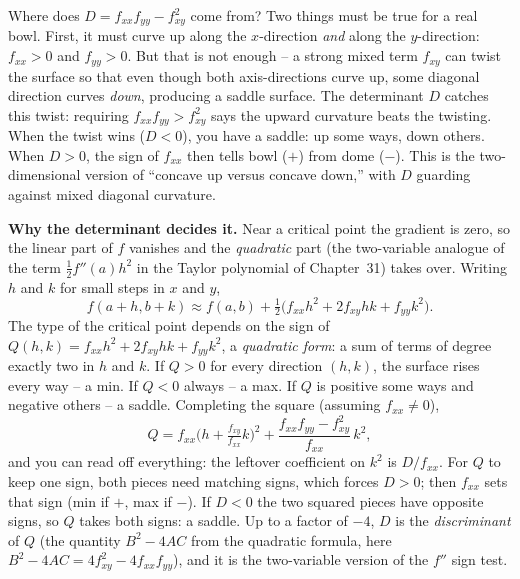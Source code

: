 \begin{intuitionbox}
Where does $D = f_{xx}f_{yy}-f_{xy}^2$ come from? Two things must be
true for a real bowl. First, it must curve up along the $x$-direction
\emph{and} along the $y$-direction: $f_{xx}>0$ and $f_{yy}>0$. But that is not
enough -- a strong mixed term $f_{xy}$ can twist the surface so that even though
both axis-directions curve up, some diagonal direction curves \emph{down},
producing a saddle surface. The determinant $D$ catches this twist: requiring $f_{xx}f_{yy} > f_{xy}^2$ says the upward
curvature beats the twisting. When the twist wins ($D<0$), you have a saddle: up
some ways, down others. When $D>0$, the sign of $f_{xx}$ then tells bowl ($+$)
from dome ($-$). This is the two-dimensional version of ``concave up versus
concave down,'' with $D$ guarding against mixed diagonal curvature.
\end{intuitionbox}

\begin{whybox}
\textbf{Why the determinant decides it.} Near a critical point
the gradient is zero, so the linear part of $f$ vanishes and the \emph{quadratic}
part (the two-variable analogue of the term $\tfrac12 f''(a)h^2$ in the Taylor
polynomial of Chapter~31) takes over. Writing $h$ and $k$ for small steps in $x$
and $y$,
\[
  f(a+h,b+k) \approx f(a,b) + \tfrac12\big(f_{xx}h^2 + 2f_{xy}hk + f_{yy}k^2\big).
\]
The type of the critical point depends on the sign of
$Q(h,k)=f_{xx}h^2 + 2f_{xy}hk + f_{yy}k^2$, a \emph{quadratic form}: a sum of
terms of degree exactly two in $h$ and $k$. If $Q>0$ for every direction $(h,k)$,
the surface rises every way -- a min. If $Q<0$ always -- a max. If $Q$ is positive
some ways and negative others -- a saddle. Completing the square (assuming
$f_{xx}\neq 0$),
\[
  Q = f_{xx}\Big(h + \tfrac{f_{xy}}{f_{xx}}k\Big)^2
      + \frac{f_{xx}f_{yy}-f_{xy}^2}{f_{xx}}\,k^2,
\]
and you can read off everything: the leftover coefficient on $k^2$ is $D/f_{xx}$.
For $Q$ to keep one sign, both pieces need matching signs, which forces $D>0$;
then $f_{xx}$ sets that sign (min if $+$, max if $-$). If $D<0$ the two squared
pieces have opposite signs, so $Q$ takes both signs: a saddle. Up to a factor of
$-4$, $D$ is the \emph{discriminant} of $Q$ (the quantity $B^2-4AC$ from the
quadratic formula, here $B^2-4AC=4f_{xy}^2-4f_{xx}f_{yy}$), and it is the
two-variable version of the $f''$ sign test.
\end{whybox}

